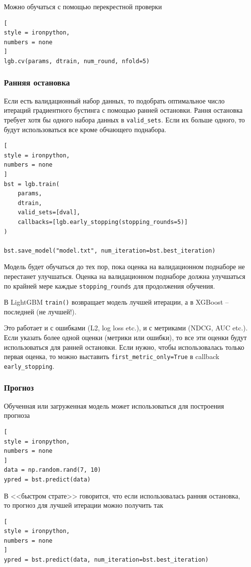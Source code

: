 \documentclass[%
	11pt,
	a4paper,
	utf8,
		]{article}
\begin{document}
Можно обучаться с помощью перекрестной проверки
\begin{lstlisting}[
style = ironpython,
numbers = none
]
lgb.cv(params, dtrain, num_round, nfold=5)
\end{lstlisting}

\subsubsection{Ранняя остановка}

Если есть валидационный набор данных, то подобрать оптимальное число итераций градиентного бустинга с помощью ранней остановки. Рання остановка требует хотя бы одного набора данных в \verb|valid_sets|. Если их больше одного, то будут использоваться все кроме обчающего поднабора.
\begin{lstlisting}[
style = ironpython,
numbers = none
]
bst = lgb.train(
    params,
    dtrain,
    valid_sets=[dval],
    callbacks=[lgb.early_stopping(stopping_rounds=5)]
)

bst.save_model("model.txt", num_iteration=bst.best_iteration)
\end{lstlisting}

Модель будет обучаться до тех пор, пока оценка на валидационном поднаборе не перестанет улучшаться. Оценка на валидационном поднаборе должна улучшаться по крайней мере каждые \verb|stopping_rounds| для продолжения обучения.

В LightGBM \verb|train()| возвращает модель лучшей итерации, а в XGBoost -- последней (не лучшей!).

Это работает и с ошибками (L2, log loss etc.), и с метриками (NDCG, AUC etc.). Если указать более одной оценки (метрики или ошибки), то все эти оценки будут использоваться для ранней остановки. Если нужно, чтобы использовалась только первая оценка, то можно выставить \verb|first_metric_only=True| в callback \verb|early_stopping|.

\subsubsection{Прогноз}

Обученная или загруженная модель может использоваться для построения прогноза
\begin{lstlisting}[
style = ironpython,
numbers = none
]
data = np.random.rand(7, 10)
ypred = bst.predict(data)
\end{lstlisting}

В <<быстром страте>> говорится, что если использовалась ранняя остановка, то прогноз для лучшей итерации можно получить так
\begin{lstlisting}[
style = ironpython,
numbers = none
]
ypred = bst.predict(data, num_iteration=bst.best_iteration)
\end{lstlisting}
\end{document}
